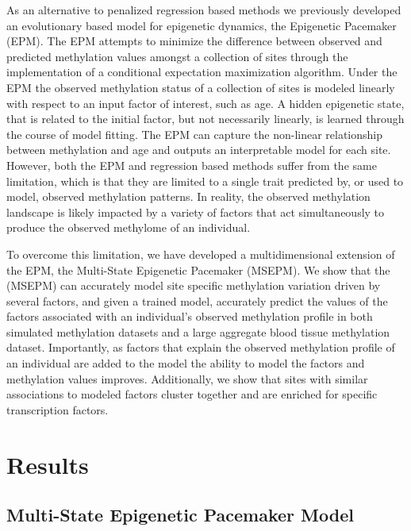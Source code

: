 \documentclass{article}
\begin{document}
{\begin{linenumbers}
As an alternative to penalized regression based methods we previously developed an evolutionary based model for 
epigenetic dynamics, the Epigenetic Pacemaker (EPM)\cite{Farrell2020-bn,Snir2016-dv}. The EPM attempts to 
minimize the difference between observed and predicted methylation values amongst a collection of sites through the 
implementation of a conditional expectation maximization algorithm\cite{Snir2020-tc}. Under the EPM the observed 
methylation status of a collection of sites is modeled linearly with respect to an input factor of interest, such 
as age. A hidden epigenetic state, that is related to the initial factor, but not necessarily linearly, is learned 
through the course of model fitting. The EPM can capture the non-linear relationship between methylation and 
age\cite{Snir2019-ii} and outputs an interpretable model for each site. However, both the EPM and regression 
based methods suffer from the same limitation, which is that they are limited to a single trait predicted by, 
or used to model, observed methylation patterns. In reality, the observed methylation landscape is likely impacted 
by a variety of factors that act simultaneously to produce the observed methylome of an individual. 

To overcome this limitation, we have developed a multidimensional extension of the EPM, the 
Multi-State Epigenetic Pacemaker (MSEPM).  We show that the (MSEPM) can accurately model  site specific 
methylation variation driven by several factors, and given a trained model, accurately predict the values of the 
factors associated with an individual's observed methylation profile in both simulated methylation datasets and a 
large aggregate blood tissue methylation dataset. Importantly, as factors that explain the observed methylation 
profile of an individual are added to the model the ability to model the factors and methylation values improves. 
Additionally, we show that sites with similar associations to modeled factors cluster together and are enriched 
for specific transcription factors.


\section{Results}

\subsection{Multi-State Epigenetic Pacemaker Model}


\end{linenumbers}}
\end{document}

